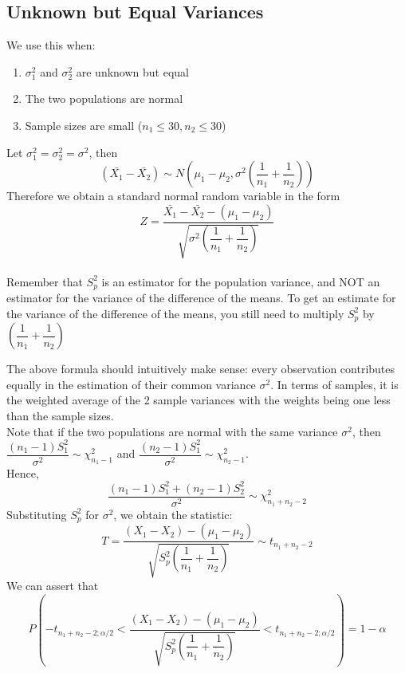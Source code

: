 \subsection{Unknown but Equal Variances}
We use this when:
\begin{enumerate}
    \item $\sigma_1^2$ and $\sigma_2^2$ are unknown but equal
    \item The two populations are normal
    \item Sample sizes are small ($n_1 \leq 30, n_2 \leq 30$)
\end{enumerate}
Let $\sigma_1^2 = \sigma_2^2 = \sigma^2$, then
$$
(\bar{X_1} - \bar{X_2}) \sim N\left( \mu_1 - \mu_2, \sigma^2\left(\dfrac{1}{n_1} + \dfrac{1}{n_2} \right) \right)
$$
Therefore we obtain a standard normal random variable in the form
$$
Z = \dfrac{\bar{X_1} - \bar{X_2} - (\mu_1 - \mu_2)}{\sqrt{\sigma^2 \left( \dfrac{1}{n_1} + \dfrac{1}{n_2} \right)}}
$$
 \\
Remember that $S_p^2$ is an estimator for the population variance, and NOT an estimator for the variance of the difference of the means. To get an estimate for the variance of the difference of the means, you still need to multiply $S_p^2$ by $\left(\dfrac{1}{n_1} + \dfrac{1}{n_2}\right)$
\begin{note}
\end{note}
The above formula should intuitively make sense: every observation contributes equally in the estimation of their common variance $\sigma^2$. In terms of samples, it is the weighted average of the 2 sample variances with the weights being one less than the sample sizes. \\
Note that if the two populations are normal with the same variance $\sigma^2$, then $\dfrac{(n_1 - 1)S_1^2}{\sigma^2} \sim \chi_{n_1 - 1}^2$ and $\dfrac{(n_2 - 1)S_1^2}{\sigma^2} \sim \chi_{n_2 - 1}^2$. \\
Hence, 
$$
\dfrac{(n_1 - 1)S_1^2 + (n_2 - 1)S_2^2}{\sigma^2} \sim \chi_{n_1 + n_2 - 2}^2
$$
Substituting $S_p^2$ for $\sigma^2$, we obtain the statistic:
$$
T = \dfrac{(X_1 - X_2) - (\mu_1 - \mu_2)}{\sqrt{S_p^2 \left( \dfrac{1}{n_1} + \dfrac{1}{n_2} \right)}} \sim t_{n_1 + n_2 - 2}
$$
We can assert that
$$
P\left( -t_{n_1 + n_2 - 2; \alpha/2} <   \dfrac{(X_1 - X_2) - (\mu_1 - \mu_2)}{\sqrt{S_p^2 \left( \dfrac{1}{n_1} + \dfrac{1}{n_2} \right)}} < t_{n_1 + n_2 - 2; \alpha/2} \right) = 1 - \alpha
$$
